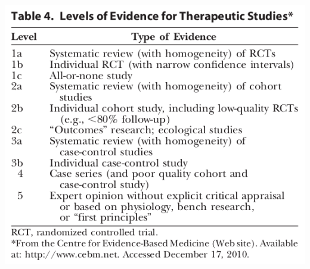 \documentclass{beamer}
\begin{document}
\begin{frame}
  \begin{center}

  \end{center}
\end{frame}

\begin{frame}
  \begin{center}
    \includegraphics[width=.8\textwidth]{Metodos/ebm-t4}
  \end{center}
\end{frame}
\end{document}
